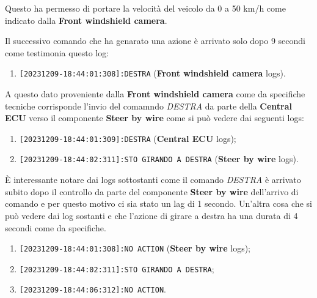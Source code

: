 \documentclass[12pt]{article}
\begin{document}
Questo ha permesso di portare la velocit\`{a} del veicolo da 0 a 50 km/h come 
indicato dalla {\bf Front windshield camera}.

Il successivo comando che ha genarato una azione \`{e} arrivato solo dopo 9 secondi
come testimonia questo log:
\begin{enumerate}
    \item \texttt{[20231209-18:44:01:308]:DESTRA} ({\bf Front windshield camera} logs).
\end{enumerate}

A questo dato proveniente dalla {\bf Front windshield camera} come da specifiche 
tecniche corrisponde l'invio del comamndo {\it DESTRA} da parte della 
{\bf Central ECU} verso il componente {\bf Steer by wire} come si pu\`{o} vedere 
dai seguenti logs:
\begin{enumerate}
    \item \texttt{[20231209-18:44:01:309]:DESTRA} ({\bf Central ECU} logs);
    \item \texttt{[20231209-18:44:02:311]:STO GIRANDO A DESTRA} ({\bf Steer by wire} logs).
\end{enumerate}

\`{E} interessante notare dai logs sottostanti come il comando {\it DESTRA} \`{e}
arrivato subito dopo il controllo da parte del componente {\bf Steer by wire}
dell'arrivo di comando e per questo motivo ci sia stato un lag di 1 secondo. 
Un'altra cosa che si pu\`{o} vedere dai log sostanti e che l'azione di girare a 
destra ha una durata di 4 secondi come da specifiche.

\begin{enumerate}
    \item \texttt{[20231209-18:44:01:308]:NO ACTION} ({\bf Steer by wire} logs);
    \item \texttt{[20231209-18:44:02:311]:STO GIRANDO A DESTRA};
    \item \texttt{[20231209-18:44:06:312]:NO ACTION}.
\end{enumerate}
\end{document}
